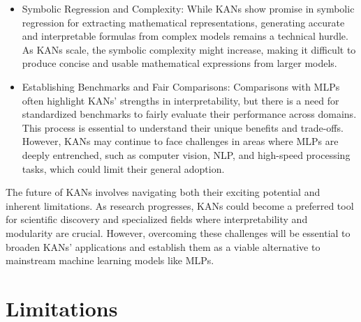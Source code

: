\begin{itemize}
    \item Symbolic Regression and Complexity: While KANs show promise in symbolic regression for extracting mathematical representations, generating accurate and interpretable formulas from complex models remains a technical hurdle. As KANs scale, the symbolic complexity might increase, making it difficult to produce concise and usable mathematical expressions from larger models.
    \item Establishing Benchmarks and Fair Comparisons: Comparisons with MLPs often highlight KANs’ strengths in interpretability, but there is a need for standardized benchmarks to fairly evaluate their performance across domains. This process is essential to understand their unique benefits and trade-offs. However, KANs may continue to face challenges in areas where MLPs are deeply entrenched, such as computer vision, NLP, and high-speed processing tasks, which could limit their general adoption.
\end{itemize}
The future of KANs involves navigating both their exciting potential and inherent limitations. As research progresses, KANs could become a preferred tool for scientific discovery and specialized fields where interpretability and modularity are crucial. However, overcoming these challenges will be essential to broaden KANs’ applications and establish them as a viable alternative to mainstream machine learning models like MLPs.
\clearpage

\section{Limitations}

